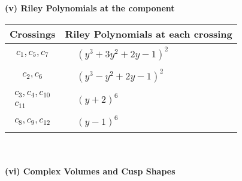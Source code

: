 \documentclass[1p]{elsarticle_modified}
\theoremstyle{definition}
\begin{document}
\newpage\renewcommand{\arraystretch}{1}
\flushleft \textbf{(v) Riley Polynomials at the component}\newline \\
\begin{tabular}{m{50pt}|m{274pt}}
Crossings & \hspace{64pt}Riley Polynomials at each crossing \\
\hline $$\begin{aligned}c_{1},c_{5},c_{7}\end{aligned}$$&$\begin{aligned}
&(y^3+3 y^2+2 y-1)^2
\end{aligned}$\\
\hline $$\begin{aligned}c_{2},c_{6}\end{aligned}$$&$\begin{aligned}
&(y^3- y^2+2 y-1)^2
\end{aligned}$\\
\hline $$\begin{aligned}c_{3},c_{4},c_{10}\\c_{11}\end{aligned}$$&$\begin{aligned}
&(y+2)^6
\end{aligned}$\\
\hline $$\begin{aligned}c_{8},c_{9},c_{12}\end{aligned}$$&$\begin{aligned}
&(y-1)^6
\end{aligned}$\\
\hline
\end{tabular}\\~\\
\newpage\flushleft \textbf{(vi) Complex Volumes and Cusp Shapes}
\end{document}
